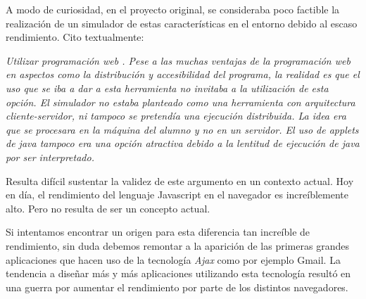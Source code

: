 A modo de curiosidad, en el proyecto original, se consideraba poco factible la realización de 
un simulador de estas características en el entorno debido al escaso rendimiento. Cito textualmente:

\bigskip
\textit{
Utilizar programación web . Pese a las muchas ventajas de la programación
web en aspectos como la distribución y accesibilidad del programa, la realidad
es que el uso que se iba a dar a esta herramienta no invitaba a la utilización de
esta opción. El simulador no estaba planteado como una herramienta con
arquitectura cliente-servidor, ni tampoco se pretendía una ejecución distribuida.
La idea era que se procesara en la máquina del alumno y no en un servidor. El
uso de applets de java tampoco era una opción atractiva debido a la lentitud de
ejecución de java por ser interpretado.}

\bigskip
Resulta difícil sustentar la validez de este argumento en un contexto actual. Hoy en día,
el rendimiento del lenguaje Javascript en el navegador es increíblemente alto. Pero no resulta
de ser un concepto actual.
 
\bigskip
Si intentamos encontrar un origen para esta diferencia tan increíble de rendimiento, sin duda
debemos remontar a la aparición de las primeras grandes aplicaciones que hacen uso de la tecnología
\textit{Ajax} como por ejemplo Gmail. La tendencia a diseñar más y más aplicaciones utilizando esta
tecnología resultó en una guerra por aumentar el rendimiento por parte de los distintos navegadores.
